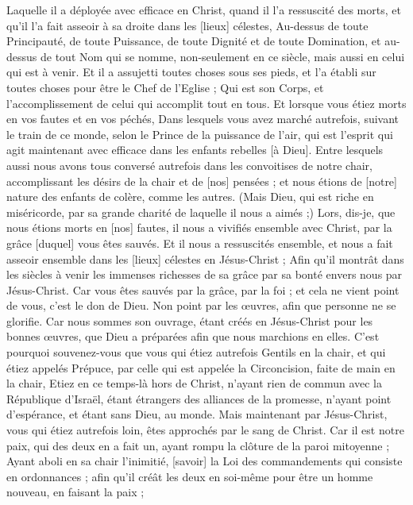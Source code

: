 \begin{multicols}{2}
Laquelle il a déployée avec efficace en Christ, quand il l'a ressuscité des morts, et qu'il l’a fait asseoir à sa droite dans les [lieux] célestes,
Au-dessus de toute Principauté, de toute Puissance, de toute Dignité et de toute Domination, et au-dessus de tout Nom qui se nomme, non-seulement en ce siècle, mais aussi en celui qui est à venir.
Et il a assujetti toutes choses sous ses pieds, et l'a établi sur toutes choses pour être le Chef de l'Eglise ;
Qui est son Corps, et l'accomplissement de celui qui accomplit tout en tous.
\VerseOne{}Et lorsque vous étiez morts en vos fautes et en vos péchés,
Dans lesquels vous avez marché autrefois, suivant le train de ce monde, selon le Prince de la puissance de l'air, qui est l'esprit qui agit maintenant avec efficace dans les enfants rebelles [à Dieu].
Entre lesquels aussi nous avons tous conversé autrefois dans les convoitises de notre chair, accomplissant les désirs de la chair et de [nos] pensées ; et nous étions de [notre] nature des enfants de colère, comme les autres.
(Mais Dieu, qui est riche en miséricorde, par sa grande charité de laquelle il nous a aimés ;)
Lors, dis-je, que nous étions morts en [nos] fautes, il nous a vivifiés ensemble avec Christ, par la grâce [duquel] vous êtes sauvés.
Et il nous a ressuscités ensemble, et nous a fait asseoir ensemble dans les [lieux] célestes en Jésus-Christ ;
Afin qu'il montrât dans les siècles à venir les immenses richesses de sa grâce par sa bonté envers nous par Jésus-Christ.
Car vous êtes sauvés par la grâce, par la foi ; et cela ne vient point de vous, c'est le don de Dieu.
Non point par les œuvres, afin que personne ne se glorifie.
Car nous sommes son ouvrage, étant créés en Jésus-Christ pour les bonnes œuvres, que Dieu a préparées afin que nous marchions en elles.
C'est pourquoi souvenez-vous que vous qui étiez autrefois Gentils en la chair, et qui étiez appelés Prépuce, par celle qui est appelée la Circoncision, faite de main en la chair,
Etiez en ce temps-là hors de Christ, n'ayant rien de commun avec la République d'Israël, étant étrangers des alliances de la promesse, n'ayant point d'espérance, et étant sans Dieu, au monde.
Mais maintenant par Jésus-Christ, vous qui étiez autrefois loin, êtes approchés par le sang de Christ.
Car il est notre paix, qui des deux en a fait un, ayant rompu la clôture de la paroi mitoyenne ;
Ayant aboli en sa chair l'inimitié, [savoir] la Loi des commandements qui consiste en ordonnances ; afin qu'il créât les deux en soi-même pour être un homme nouveau, en faisant la paix ;

\end{multicols}
